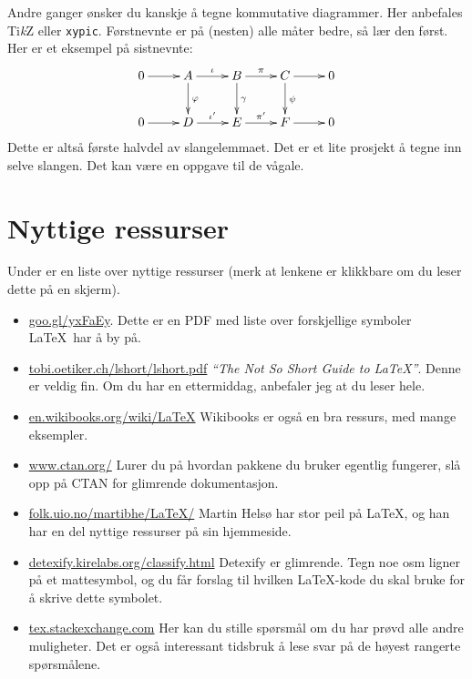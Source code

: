 \documentclass[a4paper, norsk]{article}  %
\begin{document}
Andre ganger ønsker du kanskje å tegne kommutative diagrammer. Her anbefales Ti\textit{k}Z eller \texttt{xypic}. Førstnevnte er på (nesten) alle måter bedre, så lær den først. Her er et eksempel på sistnevnte:
\begin{equation}
    \begin{gathered}
        \xymatrix
        {
            0 \ar[r] 
            &
            A \ar[r]^\iota \ar[d]^\varphi 
            & 
            B \ar[r]^\pi \ar[d]^\gamma 
            &
            C \ar[r]\ar[d]^\psi 
            & 
            0 
            \\ 
            0 \ar[r] 
            & 
            D \ar[r]^{\iota'} 
            & 
            E \ar[r]^{\pi'} 
            & 
            F \ar[r] 
            & 
            0
        }
    \end{gathered}
\end{equation}
Dette er altså første halvdel av slangelemmaet. Det er et lite prosjekt å tegne inn selve slangen. Det kan være en oppgave til de vågale.


\section{Nyttige ressurser}
\label{sec:ressurser}

Under er en liste over nyttige ressurser (merk at lenkene er klikkbare om du leser dette på en skjerm). 

\begin{itemize}
\item \url{goo.gl/yxFaEy}. Dette er en PDF med liste over forskjellige symboler \LaTeX\ har å by på.
\item \url{tobi.oetiker.ch/lshort/lshort.pdf} \emph{``The Not So Short Guide to \LaTeX''}. Denne er veldig fin. Om du har en ettermiddag, anbefaler jeg at du leser hele.
\item \url{en.wikibooks.org/wiki/LaTeX} Wikibooks er også en bra ressurs, med mange eksempler.
\item \url{www.ctan.org/} Lurer du på hvordan pakkene du bruker egentlig fungerer, slå opp på CTAN for glimrende dokumentasjon.
\item \url{folk.uio.no/martibhe/LaTeX/} Martin Helsø har stor peil på \LaTeX, og han har en del nyttige ressurser på sin hjemmeside. 
\item \url{detexify.kirelabs.org/classify.html}  Detexify er glimrende. Tegn noe osm ligner på et mattesymbol, og du får forslag til hvilken \LaTeX-kode du skal bruke for å skrive dette symbolet. 
\item \url{tex.stackexchange.com} Her kan du stille spørsmål om du har prøvd alle andre muligheter. Det er også interessant tidsbruk å lese svar på de høyest rangerte spørsmålene.
\end{itemize}
\end{document}
